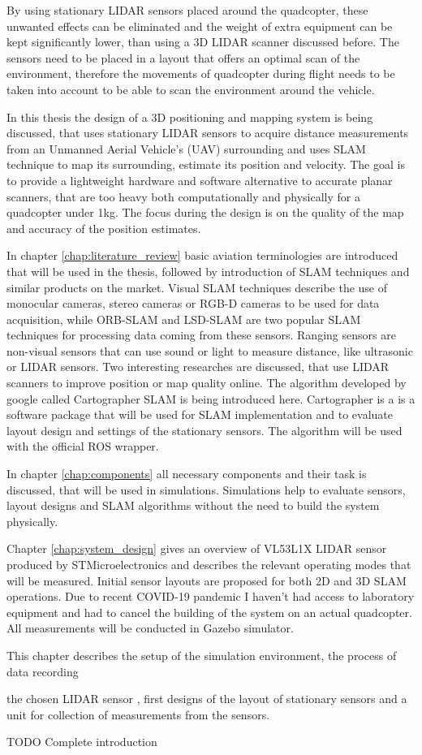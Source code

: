 By using stationary LIDAR sensors placed around the quadcopter, these unwanted effects can be eliminated and the weight of 
extra equipment can be kept significantly lower, than using a 3D LIDAR scanner discussed before. The sensors need to be placed
in a layout that offers an optimal scan of the environment, therefore the movements of quadcopter during flight needs to be 
taken into account to be able to scan the environment around the vehicle.

In this thesis the design of a 3D positioning and mapping system is being discussed, that uses stationary LIDAR sensors to 
acquire distance measurements from an Unmanned Aerial Vehicle's (UAV) surrounding and uses SLAM technique to map its 
surrounding, estimate its position and velocity. The goal is to provide a lightweight hardware and software alternative to 
accurate planar scanners, that are too heavy both computationally and physically for a quadcopter under 1kg. The focus during 
the design is on the quality of the map and accuracy of the position estimates.

In chapter \ref{chap:literature_review} basic aviation terminologies are introduced that will be used in the thesis, followed
by introduction of SLAM techniques and similar products on the market. Visual SLAM techniques describe the use of monocular 
cameras, stereo cameras or RGB-D cameras to be used for data acquisition, while ORB-SLAM and LSD-SLAM are two popular SLAM
techniques for processing data coming from these sensors. Ranging sensors are non-visual sensors that can use sound
or light to measure distance, like ultrasonic or LIDAR sensors. Two interesting researches are discussed, that use 
LIDAR scanners to improve position or map quality online. The algorithm developed by google called Cartographer SLAM 
is being introduced here. Cartographer is a is a software package that will be used for SLAM implementation and  to evaluate 
layout design and settings of the stationary sensors. The algorithm will be used with the official ROS wrapper.

In chapter \ref{chap:components} all necessary components and their task is discussed, that will be used in  
simulations. Simulations help to evaluate sensors, layout designs and SLAM algorithms without the need to build the system
physically. 
 
Chapter \ref{chap:system_design} gives an overview of VL53L1X LIDAR sensor produced by STMicroelectronics and describes the
relevant operating modes that will be measured. Initial sensor layouts are proposed for both 2D and 3D SLAM operations. 
Due to recent COVID-19 pandemic I haven't had access to laboratory equipment and had to cancel the building of the system on 
an actual quadcopter. All measurements will be conducted in Gazebo simulator.




This chapter describes the setup of the simulation environment, the process of data recording 

the chosen LIDAR sensor , first designs 
of the layout of stationary sensors and a unit for collection of measurements from the sensors.




TODO Complete introduction